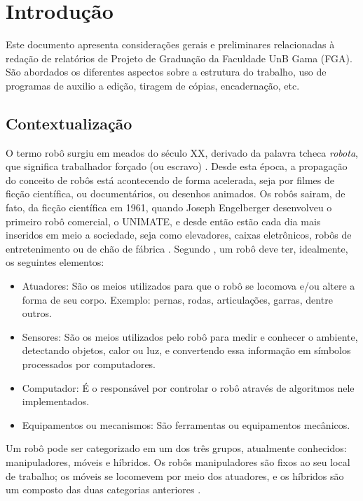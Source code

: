 \chapter{Introdução}

Este documento apresenta considerações gerais e preliminares relacionadas 
à redação de relatórios de Projeto de Graduação da Faculdade UnB Gama 
(FGA). São abordados os diferentes aspectos sobre a estrutura do trabalho, 
uso de programas de auxilio a edição, tiragem de cópias, encadernação, etc.

\section{Contextualização}

O termo robô surgiu em meados do século XX, derivado da palavra tcheca \textit{robota}, que significa trabalhador forçado (ou escravo) \cite{da2009roboeduc}. Desde esta época, a propagação do conceito de robôs está acontecendo de forma acelerada, seja por filmes de ficção científica, ou documentários, ou desenhos animados. 
Os robôs sairam, de fato, da ficção científica em 1961, quando Joseph Engelberger desenvolveu o primeiro robô comercial, o UNIMATE, e desde então estão cada dia mais inseridos em meio a sociedade, seja como elevadores, caixas eletrônicos, robôs de entretenimento ou de chão de fábrica . 
Segundo \cite{da2009roboeduc}, um robô deve ter, idealmente, os seguintes elementos:
\begin{itemize}
\item Atuadores: São os meios utilizados para que o robô se locomova e/ou altere a forma de seu corpo. Exemplo: pernas, rodas, articulações, garras, dentre outros.
\item Sensores: São os meios utilizados pelo robô para medir e conhecer o ambiente, detectando objetos, calor ou luz, e convertendo essa informação em símbolos processados por computadores.
\item Computador: É o responsável por controlar o robô através de algoritmos nele implementados.
\item Equipamentos ou mecanismos: São ferramentas ou equipamentos mecânicos.
\end{itemize}

Um robô pode ser categorizado em um dos três grupos, atualmente conhecidos: manipuladores, móveis e híbridos. Os robôs manipuladores são fixos ao seu local de trabalho; os móveis se locomevem por meio dos atuadores, e os híbridos são um composto das duas categorias anteriores  .

